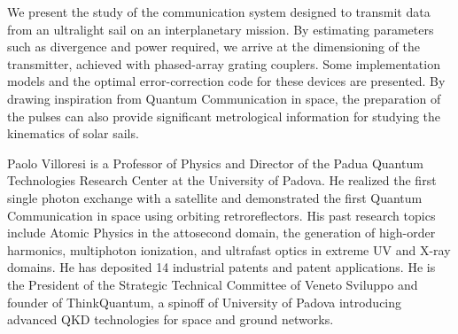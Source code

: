 \documentclass[a4paper,parskip,10pt]{scrartcl}
\begin{document}
    \begin{tcolorbox}[
        enhanced,
        title={Keynote Lecture 4: Paolo Villoresi (University of Padova) \\  Harnessing the light emission for extreme space optical communication},
        sharp corners,
        colbacktitle=thistrack,
        fonttitle=\large\mediumfont,
        boxsep=0pt,
        boxrule=0pt,
        left*=0pt,
        lefttitle=4mm,
        toptitle=4mm,
        bottomtitle=4mm,
        top=0pt,
        bottom=0pt,
        sidebyside,
        sidebyside align=center,
        lefthand width=6cm,
        segmentation empty,
    ]%
        
        \tcblower

        \setlength{\parskip}{1ex}
        
        \vspace{1ex}
        We present the study of the communication system designed to transmit data from an ultralight sail on an interplanetary mission. By estimating parameters such as divergence and power required, we arrive at the dimensioning of the transmitter, achieved with phased-array grating couplers. Some implementation models and the optimal error-correction code for these devices are presented. By drawing inspiration from Quantum Communication in space, the preparation of the pulses can also provide significant metrological information for studying the kinematics of solar sails.

        {
            \small
            \color{white!20!black}
            Paolo Villoresi is a Professor of Physics and Director of the Padua Quantum Technologies Research Center at the University of Padova. He realized the first single photon exchange with a satellite and demonstrated the first Quantum Communication in space using orbiting retroreflectors. His past research topics include Atomic Physics in the attosecond domain, the generation of high-order harmonics, multiphoton ionization, and ultrafast optics in extreme UV and X-ray domains. He has deposited 14 industrial patents and patent applications. He is the President of the Strategic Technical Committee of Veneto Sviluppo and founder of ThinkQuantum, a spinoff of University of Padova introducing advanced QKD technologies for space and ground networks.}


\end{tcolorbox}
\end{document}
